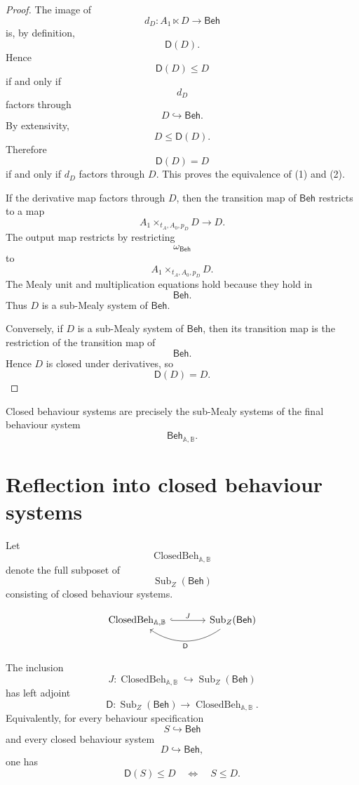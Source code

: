 \begin{proof}
The image of
\[
d_D:
A_1\ltimes D\to\mathsf{Beh}
\]
is, by definition,
\[
\mathsf D(D).
\]
Hence
\[
\mathsf D(D)\leq D
\]
if and only if
\[
d_D
\]
factors through
\[
D\hookrightarrow\mathsf{Beh}.
\]
By extensivity,
\[
D\leq\mathsf D(D).
\]
Therefore
\[
\mathsf D(D)=D
\]
if and only if \(d_D\) factors through \(D\). This proves the equivalence of
(1) and (2).

If the derivative map factors through \(D\), then the transition map of
\(\mathsf{Beh}\) restricts to a map
\[
A_1\times_{t_A,A_0,p_D}D\to D.
\]
The output map restricts by restricting
\[
\omega_{\mathsf{Beh}}
\]
to
\[
A_1\times_{t_A,A_0,p_D}D.
\]
The Mealy unit and multiplication equations hold because they hold in
\[
\mathsf{Beh}.
\]
Thus \(D\) is a sub-Mealy system of \(\mathsf{Beh}\).

Conversely, if \(D\) is a sub-Mealy system of \(\mathsf{Beh}\), then its
transition map is the restriction of the transition map of
\[
\mathsf{Beh}.
\]
Hence \(D\) is closed under derivatives, so
\[
\mathsf D(D)=D.
\]
\end{proof}

\begin{corollary}
\label{cor:closed-behaviours-submealy}
Closed behaviour systems are precisely the sub-Mealy systems of the final
behaviour system
\[
\mathsf{Beh}_{\mathbb A,\mathbb B}.
\]
\end{corollary}

\section{Reflection into closed behaviour systems}
\label{sec:reflection-closed-behaviour-systems}

Let
\[
\operatorname{ClosedBeh}_{\mathbb A,\mathbb B}
\]
denote the full subposet of
\[
\operatorname{Sub}_Z(\mathsf{Beh})
\]
consisting of closed behaviour systems.

\[
\begin{tikzcd}[column sep=large]
\operatorname{ClosedBeh}_{\mathbb A,\mathbb B}
\arrow[r, hook, "J"]
&
\operatorname{Sub}_Z(\mathsf{Beh})
\arrow[l, bend left=35, "\mathsf D"]
\end{tikzcd}
\]

\begin{theorem}
\label{thm:reflection-closed-behaviour-systems}
The inclusion
\[
J:
\operatorname{ClosedBeh}_{\mathbb A,\mathbb B}
\hookrightarrow
\operatorname{Sub}_Z(\mathsf{Beh})
\]
has left adjoint
\[
\mathsf D:
\operatorname{Sub}_Z(\mathsf{Beh})
\to
\operatorname{ClosedBeh}_{\mathbb A,\mathbb B}.
\]
Equivalently, for every behaviour specification
\[
S\hookrightarrow\mathsf{Beh}
\]
and every closed behaviour system
\[
D\hookrightarrow\mathsf{Beh},
\]
one has
\[
\mathsf D(S)\leq D
\quad\Longleftrightarrow\quad
S\leq D.
\]
\end{theorem}

